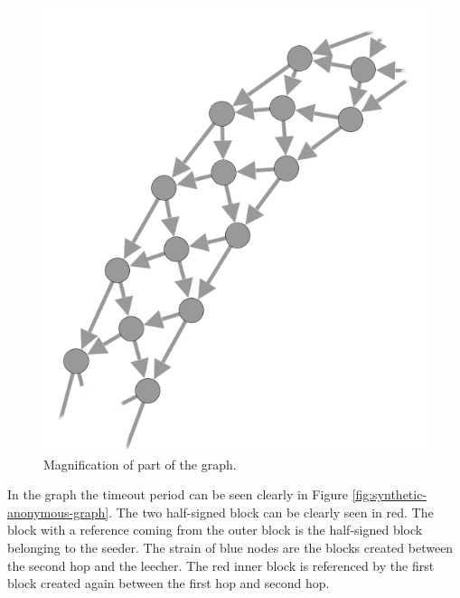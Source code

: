 \begin{figure}
	\centerline{\includegraphics[scale=0.5]{experimentation/synthetic/anonymous/anonymous-magnified.png}}
	\caption{Magnification of part of the graph.}
	\label{fig:synthetic-anonymous-graph-magnified}
\end{figure}

In the graph the timeout period can be seen clearly in Figure \ref{fig:synthetic-anonymous-graph}.
The two half-signed block can be clearly seen in red.
The block with a reference coming from the outer block is the half-signed block belonging to the seeder.
The strain of blue nodes are the blocks created between the second hop and the leecher.
The red inner block is referenced by the first block created again between the first hop and second hop.





